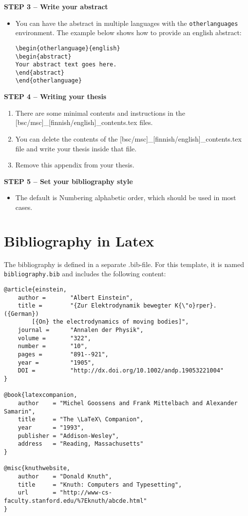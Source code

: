 {\textbf{STEP 3 -- Write your abstract}}

\begin{itemize}
\item You can have the abstract in multiple languages with the \texttt{otherlanguages} environment. The example below shows how to provide an english abstract: 

\begin{verbatim}
\begin{otherlanguage}{english} 
\begin{abstract}
Your abstract text goes here. 
\end{abstract} 
\end{otherlanguage}
\end{verbatim}

\end{itemize}

{\textbf{STEP 4 -- Writing your thesis}}

\begin{enumerate}
\item There are some minimal contents and instructions in the [bsc/msc]\_[finnish/english]\_contents.tex files.
\item You can delete the contents of the [bsc/msc]\_[finnish/english]\_contents.tex file and write your thesis inside that file.
\item Remove this appendix from your thesis.
\end{enumerate}

{\textbf{STEP 5 -- Set your bibliography style}}

\begin{itemize}
\item The default is Numbering alphabetic order, which should be used in most cases.
\end{itemize}

\section{Bibliography in Latex}

The bibliography is defined in a separate .bib-file. For this template, it is named \texttt{bibliography.bib} and includes the following content:
\begin{verbatim}
@article{einstein,
    author =       "Albert Einstein",
    title =        "{Zur Elektrodynamik bewegter K{\"o}rper}. ({German})
        [{On} the electrodynamics of moving bodies]",
    journal =      "Annalen der Physik",
    volume =       "322",
    number =       "10",
    pages =        "891--921",
    year =         "1905",
    DOI =          "http://dx.doi.org/10.1002/andp.19053221004"
}
 
@book{latexcompanion,
    author    = "Michel Goossens and Frank Mittelbach and Alexander Samarin",
    title     = "The \LaTeX\ Companion",
    year      = "1993",
    publisher = "Addison-Wesley",
    address   = "Reading, Massachusetts"
}
 
@misc{knuthwebsite,
    author    = "Donald Knuth",
    title     = "Knuth: Computers and Typesetting",
    url       = "http://www-cs-faculty.stanford.edu/%7Eknuth/abcde.html"
}
\end{verbatim}

